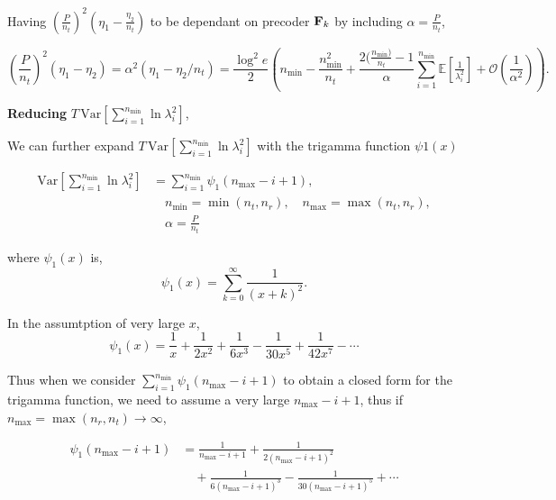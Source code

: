 \documentclass[a4paper, 12pt, onecolumn, journal, twoside, draftclsnofoot]{IEEEtran}
\begin{document}
Having $(\frac{P}{n_t})^2 (\eta_1-\frac{\eta_2}{n_t})$ to be dependant on precoder ${\bf F}_k$ by including $\alpha = \frac{P}{n_t}$,

\begin{equation*}
(\frac{P}{n_t})^2 (\eta_1-\eta_2)= \alpha^2(\eta_1-\eta_2/n_t)
= \frac{\log^2 e}{2}\left(
n_{\min}- \frac{n_{\min}^2}{n_t}
+ \frac{ 2( \frac{ n_{\min})} {n_t} -1 } {\alpha}\sum_{i=1}^{n_{\min}}\mathbb{E}\!\left[\tfrac{1}{\lambda_i^2}\right]
+ \mathcal{O}\!\left(\frac{1}{\alpha^2}\right)\right).
\end{equation*}




\textbf{Reducing}  $T\,\mathrm{Var}\!\left[\sum_{i=1}^{n_{\min}}\ln \lambda_i^2\right]$,

We can further expand $T\,\mathrm{Var}\!\left[\sum_{i=1}^{n_{\min}}\ln \lambda_i^2\right]$ with the trigamma function $\psi1(x)$

\begin{equation*}
\begin{aligned}
\mathrm{Var}\!\left[\sum_{i=1}^{n_{\min}}\ln \lambda_i^2\right] 
&= \sum_{i=1}^{n_{\min}} \psi_1(n_{\max}-i+1),\\
&\quad n_{\min} = \min(n_t,n_r), \quad n_{\max} = \max(n_t,n_r),\\
&\quad \alpha = \frac{P}{n_t}
\end{aligned}
\end{equation*}

where $\psi_1(x)$ is, 
\begin{equation*}
\psi_1(x)=\sum_{k=0}^\infty\frac{1}{(x+k)^2}.
\end{equation*}

In the assumtption of very large $x$, 
\begin{equation*}
\psi_1(x)=\frac{1}{x}+\frac{1}{2x^2}+\frac{1}{6x^3}-\frac{1}{30x^5}+\frac{1}{42x^7}-\cdots
\end{equation*}

Thus when we consider $\sum_{i=1}^{n_{\min}} \psi_1(n_{\max}-i+1)$ to obtain a closed form for the trigamma function, we need to assume a very large $n_{\max}-i+1$, thus if $n_{\max} = \max(n_r,n_t) \to \infty$, 

\begin{equation*}
\begin{split}
\psi_1(n_{\max}-i+1)
&= \frac{1}{n_{\max}-i+1}
+ \frac{1}{2(n_{\max}-i+1)^2} \\
&\quad+ \frac{1}{6(n_{\max}-i+1)^3}
- \frac{1}{30(n_{\max}-i+1)^5}
+ \cdots
\end{split}
\end{equation*}
\end{document}
